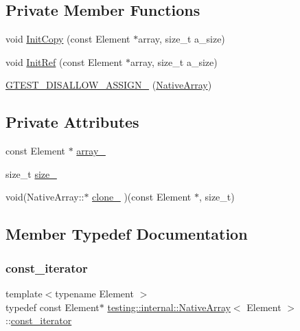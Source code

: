 \subsection*{Private Member Functions}
\begin{DoxyCompactItemize}
\item 
void \hyperlink{classtesting_1_1internal_1_1NativeArray_a8c0069cc09f559785fe4923fc118056f}{Init\+Copy} (const Element $\ast$array, size\+\_\+t a\+\_\+size)
\item 
void \hyperlink{classtesting_1_1internal_1_1NativeArray_ac6ad6d79e17e2c98a9d4d684afcb7f79}{Init\+Ref} (const Element $\ast$array, size\+\_\+t a\+\_\+size)
\item 
\hyperlink{classtesting_1_1internal_1_1NativeArray_a6633f3eab6947d4502fb1c69f95be66e}{G\+T\+E\+S\+T\+\_\+\+D\+I\+S\+A\+L\+L\+O\+W\+\_\+\+A\+S\+S\+I\+G\+N\+\_\+} (\hyperlink{classtesting_1_1internal_1_1NativeArray}{Native\+Array})
\end{DoxyCompactItemize}
\subsection*{Private Attributes}
\begin{DoxyCompactItemize}
\item 
const Element $\ast$ \hyperlink{classtesting_1_1internal_1_1NativeArray_adadc025fbbbd43904d4036991019f18f}{array\+\_\+}
\item 
size\+\_\+t \hyperlink{classtesting_1_1internal_1_1NativeArray_aa7e4251de39aaa75f697f0eaeedbf06e}{size\+\_\+}
\item 
void(Native\+Array\+::$\ast$ \hyperlink{classtesting_1_1internal_1_1NativeArray_addd7442a10398a60215a9989bcbd8078}{clone\+\_\+} )(const Element $\ast$, size\+\_\+t)
\end{DoxyCompactItemize}


\subsection{Member Typedef Documentation}
\mbox{\label{classtesting_1_1internal_1_1NativeArray_a9ce7c8408460d7158a2870456d134557}} 
\subsubsection{\texorpdfstring{const\+\_\+iterator}{const\_iterator}}
{\footnotesize\ttfamily template$<$typename Element $>$ \\
typedef const Element$\ast$ \hyperlink{classtesting_1_1internal_1_1NativeArray}{testing\+::internal\+::\+Native\+Array}$<$ Element $>$\+::\hyperlink{classtesting_1_1internal_1_1NativeArray_a9ce7c8408460d7158a2870456d134557}{const\+\_\+iterator}}

